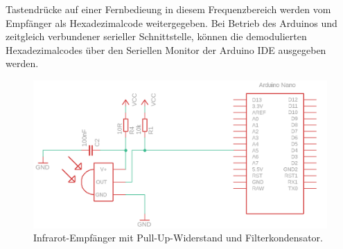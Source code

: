 \documentclass[11pt, titlepage, fleqn]{report}
\begin{document}
				Tastendrücke auf einer Fernbedieung in diesem Frequenzbereich werden vom Empfänger als Hexadezimalcode weitergegeben. Bei Betrieb des Arduinos und zeitgleich verbundener serieller Schnittstelle, können die demodulierten Hexadezimalcodes über den Seriellen Monitor der Arduino IDE ausgegeben werden.
				\begin{figure}[htbp]
					\centering
					\includegraphics[width=\linewidth]{./img/ir.png}
					\caption{ Infrarot-Empfänger mit Pull-Up-Widerstand und Filterkondensator.
					\label{fig:imgIR}}
				\end{figure}
			\newpage	
\end{document}
